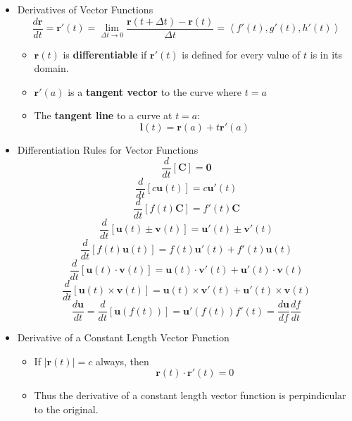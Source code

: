 \documentclass[12pt]{article}
\newcommand{\ds}{\displaystyle}
\renewcommand{\vec}[1]{\mathbf{#1}}
\newcommand{\<}{\left<}
\renewcommand{\>}{\right>}
\begin{document}
\begin{itemize}
  \item Derivatives of Vector Functions
      \[\ds \frac{d\vec{r}}{dt} = \vec{r}'(t) = \lim_{\Delta t \to 0} \frac{\vec{r}(t+\Delta t) - \vec{r}(t)}{\Delta t} = \<f'(t),g'(t),h'(t)\>\]
    \begin{itemize}
      \item $\vec{r}(t)$ is \textbf{differentiable} if $\vec{r}'(t)$ is defined for every value of $t$ is in its domain.
      \item $\vec{r}'(a)$ is a \textbf{tangent vector} to the curve where $t=a$
      \item The \textbf{tangent line} to a curve at $t=a$: \[\vec{l}(t)=\vec{r}(a)+t\vec{r}'(a)\]
    \end{itemize}

  
  \item Differentiation Rules for Vector Functions
      \[\frac{d}{dt} [\vec{C}] = \vec{0}\]
      \[\frac{d}{dt} [c\vec{u}(t)] = c\vec{u}'(t)\]
      \[\frac{d}{dt} [f(t)\vec{C}] = f'(t)\vec{C}\]
      \[\frac{d}{dt} [\vec{u}(t) \pm \vec{v}(t)] = \vec{u}'(t) \pm \vec{v}'(t)\]
      \[\frac{d}{dt} [f(t)\vec{u}(t)] = f(t)\vec{u}'(t) + f'(t)\vec{u}(t)\]
      \[\frac{d}{dt} [\vec{u}(t) \cdot \vec{v}(t)] = \vec{u}(t)\cdot\vec{v}'(t) + \vec{u}'(t)\cdot\vec{v}(t)\]
      \[\frac{d}{dt} [\vec{u}(t) \times \vec{v}(t)] = \vec{u}(t)\times\vec{v}'(t) + \vec{u}'(t)\times\vec{v}(t)\]
      \[\frac{d\vec{u}}{dt} = \frac{d}{dt} [\vec{u}(f(t))] =\vec{u}'(f(t))f'(t) = \frac{d\vec{u}}{df}\frac{df}{dt}\]
  
  \item Derivative of a Constant Length Vector Function
    \begin{itemize}
      \item If $|\vec{r}(t)|=c$ always, then \[\vec{r}(t) \cdot \vec{r}'(t) = 0\]
      \item Thus the derivative of a constant length vector function is perpindicular to the original.
    \end{itemize}
  

\end{itemize}
\end{document}
